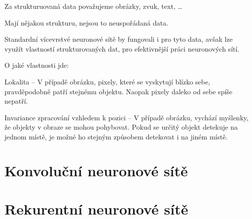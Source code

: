 \begin{compactitem}
    \item Za strukturuovaná data považujeme obrázky, zvuk, text, \dots \begin{compactitem}
        \item Mají nějakou strukturu, nejsou to neuspořádaná data.
    \end{compactitem}

    \item Standardní vícevrstvé neuronové sítě by fungovali i pro tyto data, avšak lze využít vlastností strukturovaných dat, pro efektivnější práci neuronových sítí.

    O jaké vlastnosti jde: \begin{compactitem}
        \item Lokalita -- V případě obrázku, pixely, které se vyskytují blízko sebe, pravděpodobně patří stejnému objektu. Naopak pixely daleko od sebe spíše nepatří.

        \item Invariance zpracování vzhledem k pozici -- V případě obrázku, vychází myšlenky, že objekty v obraze se mohou pohybovat. Pokud se určitý objekt detekuje na jednom místě, je možné ho stejným způsobem detekovat i na jiném místě.
    \end{compactitem}
\end{compactitem}


\section{Konvoluční neuronové sítě}



\section{Rekurentní neuronové sítě}

